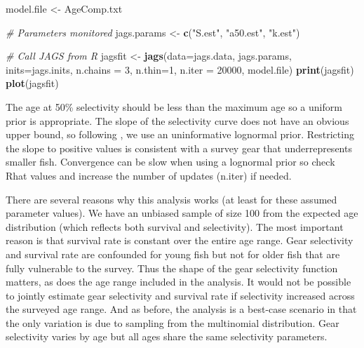 \documentclass[
]{krantz}
\makeatletter
\newenvironment{Shaded}{\begin{snugshade}}{\end{snugshade}}
\newcommand{\AttributeTok}[1]{\textcolor[rgb]{0.27,0.27,0.27}{#1}}
\newcommand{\CommentTok}[1]{\textcolor[rgb]{0.37,0.37,0.37}{\textit{#1}}}
\newcommand{\DecValTok}[1]{\textcolor[rgb]{0.06,0.06,0.06}{#1}}
\newcommand{\FunctionTok}[1]{\textcolor[rgb]{0.27,0.27,0.27}{\textbf{#1}}}
\newcommand{\NormalTok}[1]{#1}
\newcommand{\OtherTok}[1]{\textcolor[rgb]{0.37,0.37,0.37}{#1}}
\newcommand{\StringTok}[1]{\textcolor[rgb]{0.5,0.5,0.5}{#1}}
\newenvironment{kframe}{%
\medskip{}
\setlength{\fboxsep}{.8em}
 \def\at@end@of@kframe{}%
 \ifinner\ifhmode%
  \def\at@end@of@kframe{\end{minipage}}%
  \begin{minipage}{\columnwidth}%
 \fi\fi%
 \def\FrameCommand##1{\hskip\@totalleftmargin \hskip-\fboxsep
 \colorbox{shadecolor}{##1}\hskip-\fboxsep
     \hskip-\linewidth \hskip-\@totalleftmargin \hskip\columnwidth}%
 \MakeFramed {\advance\hsize-\width
   \@totalleftmargin\z@ \linewidth\hsize
   \@setminipage}}%
 {\par\unskip\endMakeFramed%
 \at@end@of@kframe}
\renewenvironment{Shaded}{\begin{kframe}}{\end{kframe}}
\makeatother
\begin{document}
\begin{Shaded}
\begin{Highlighting}[]
\NormalTok{model.file }\OtherTok{\textless{}{-}} \StringTok{\textquotesingle{}AgeComp.txt\textquotesingle{}}

\CommentTok{\# Parameters monitored}
\NormalTok{jags.params }\OtherTok{\textless{}{-}} \FunctionTok{c}\NormalTok{(}\StringTok{"S.est"}\NormalTok{, }\StringTok{"a50.est"}\NormalTok{, }\StringTok{"k.est"}\NormalTok{)}

\CommentTok{\# Call JAGS from R}
\NormalTok{jagsfit }\OtherTok{\textless{}{-}} \FunctionTok{jags}\NormalTok{(}\AttributeTok{data=}\NormalTok{jags.data, jags.params, }\AttributeTok{inits=}\NormalTok{jags.inits,}
                \AttributeTok{n.chains =} \DecValTok{3}\NormalTok{, }\AttributeTok{n.thin=}\DecValTok{1}\NormalTok{, }\AttributeTok{n.iter =} \DecValTok{20000}\NormalTok{,}
\NormalTok{                model.file)}
\FunctionTok{print}\NormalTok{(jagsfit)}
\FunctionTok{plot}\NormalTok{(jagsfit)}
\end{Highlighting}
\end{Shaded}

The age at 50\% selectivity should be less than the maximum age so a uniform prior is appropriate. The slope of the selectivity curve does not have an obvious upper bound, so following \citet{mccarthy_2007}, we use an uninformative lognormal prior. Restricting the slope to positive values is consistent with a survey gear that underrepresents smaller fish. Convergence can be slow when using a lognormal prior so check Rhat values and increase the number of updates (n.iter) if needed.

There are several reasons why this analysis works (at least for these assumed parameter values). We have an unbiased sample of size 100 from the expected age distribution (which reflects both survival and selectivity). The most important reason is that survival rate is constant over the entire age range. Gear selectivity and survival rate are confounded for young fish but not for older fish that are fully vulnerable to the survey. Thus the shape of the gear selectivity function matters, as does the age range included in the analysis. It would not be possible to jointly estimate gear selectivity and survival rate if selectivity increased across the surveyed age range. And as before, the analysis is a best-case scenario in that the only variation is due to sampling from the multinomial distribution. Gear selectivity varies by age but all ages share the same selectivity parameters.
\end{document}
